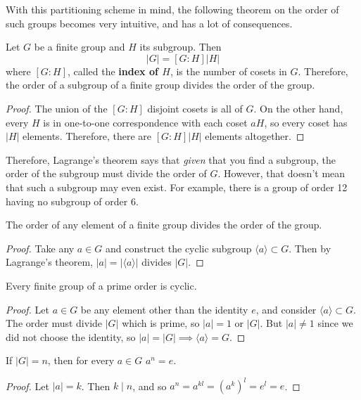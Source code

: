   With this partitioning scheme in mind, the following theorem on the order of such groups becomes very intuitive, and has a lot of consequences. 

  \begin{theorem}
    Let $G$ be a finite group and $H$ its subgroup. Then 
    \begin{equation}
      |G| = [G:H] |H|
    \end{equation}
    where $[G:H]$, called the \textbf{index of $H$}, is the number of cosets in $G$. Therefore, the order of a subgroup of a finite group divides the order of the group. 
  \end{theorem}
  \begin{proof}
    The union of the $[G:H]$ disjoint cosets is all of $G$. On the other hand, every $H$ is in one-to-one correspondence with each coset $aH$, so every coset has $|H|$ elements. Therefore, there are $[G:H] |H|$ elements altogether. 
  \end{proof}

  Therefore, Lagrange's theorem says that \textit{given} that you find a subgroup, the order of the subgroup must divide the order of $G$. However, that doesn't mean that such a subgroup may even exist. For example, there is a group of order 12 having no subgroup of order 6. 

  \begin{corollary}
    The order of any element of a finite group divides the order of the group. 
  \end{corollary}
  \begin{proof}
    Take any $a \in G$ and construct the cyclic subgroup $\langle a \rangle \subset G$. Then by Lagrange's theorem, $|a| = |\langle a \rangle|$ divides $|G|$. 
  \end{proof}

  \begin{corollary}
    Every finite group of a prime order is cyclic. 
  \end{corollary}
  \begin{proof}
    Let $a \in G$ be any element other than the identity $e$, and consider $\langle a \rangle \subset G$. The order must divide $|G|$ which is prime, so $|a| = 1$ or $|G|$. But $|a| \neq 1$ since we did not choose the identity, so $|a| = |G| \implies \langle a \rangle = G$. 
  \end{proof}

  \begin{corollary}
    If $|G| = n$, then for every $a \in G$ $a^n = e$. 
  \end{corollary}
  \begin{proof}
    Let $|a| = k$. Then $k \mid n$, and so $a^n = a^{kl} = (a^k)^l = e^l = e$. 
  \end{proof}

